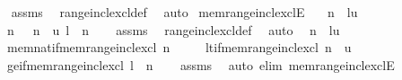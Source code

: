 \begin{isabellebody}
%
\isadelimproof
\ \ %
\endisadelimproof
%
\isatagproof
{}\isamarkupfalse%
\ assms\ \isamarkupfalse%
\ range{\isacharunderscore}{\kern0pt}incl{\isacharunderscore}{\kern0pt}excl{\isacharunderscore}{\kern0pt}def\ \isamarkupfalse%
\ auto%
\endisatagproof
{\isafoldproof}%
%
\isadelimproof
\isanewline
%
\endisadelimproof
\isanewline
{}\isamarkupfalse%
\ mem{\isacharunderscore}{\kern0pt}range{\isacharunderscore}{\kern0pt}incl{\isacharunderscore}{\kern0pt}exclE{\isacharcolon}{\kern0pt}\isanewline
\ \ \ {\isachardoublequoteopen}n\ {\isasymin}\ {\isacharbrackleft}{\kern0pt}l{\isacharcomma}{\kern0pt}{\isasymdots}{\isacharcomma}{\kern0pt}u{\isacharbrackleft}{\kern0pt}{\isachardoublequoteclose}\isanewline
\ \ \ {\isachardoublequoteopen}n\ {\isasymin}\ {\isasymnat}{\isachardoublequoteclose}\ {\isachardoublequoteopen}n\ {\isacharless}{\kern0pt}\ u{\isachardoublequoteclose}\ {\isachardoublequoteopen}l\ {\isasymle}\ n{\isachardoublequoteclose}\isanewline
%
\isadelimproof
\ \ %
\endisadelimproof
%
\isatagproof
{}\isamarkupfalse%
\ assms\ \isamarkupfalse%
\ range{\isacharunderscore}{\kern0pt}incl{\isacharunderscore}{\kern0pt}excl{\isacharunderscore}{\kern0pt}def\ \isamarkupfalse%
\ auto%
\endisatagproof
{\isafoldproof}%
%
\isadelimproof
\isanewline
%
\endisadelimproof
\isanewline
{}\isamarkupfalse%
\ \ {\isachardoublequoteopen}n\ {\isasymin}\ {\isacharbrackleft}{\kern0pt}l{\isacharcomma}{\kern0pt}{\isasymdots}{\isacharcomma}{\kern0pt}u{\isacharbrackleft}{\kern0pt}{\isachardoublequoteclose}\isanewline
\ \ \ mem{\isacharunderscore}{\kern0pt}nat{\isacharunderscore}{\kern0pt}if{\isacharunderscore}{\kern0pt}mem{\isacharunderscore}{\kern0pt}range{\isacharunderscore}{\kern0pt}incl{\isacharunderscore}{\kern0pt}excl{\isacharcolon}{\kern0pt}\ {\isachardoublequoteopen}n\ {\isasymin}\ {\isasymnat}{\isachardoublequoteclose}\isanewline
\ \ \ lt{\isacharunderscore}{\kern0pt}if{\isacharunderscore}{\kern0pt}mem{\isacharunderscore}{\kern0pt}range{\isacharunderscore}{\kern0pt}incl{\isacharunderscore}{\kern0pt}excl{\isacharcolon}{\kern0pt}\ {\isachardoublequoteopen}n\ {\isacharless}{\kern0pt}\ u{\isachardoublequoteclose}\isanewline
\ \ \ ge{\isacharunderscore}{\kern0pt}if{\isacharunderscore}{\kern0pt}mem{\isacharunderscore}{\kern0pt}range{\isacharunderscore}{\kern0pt}incl{\isacharunderscore}{\kern0pt}excl{\isacharcolon}{\kern0pt}\ {\isachardoublequoteopen}l\ {\isasymle}\ n{\isachardoublequoteclose}\isanewline
%
\isadelimproof
\ \ %
\endisadelimproof
%
\isatagproof
{}\isamarkupfalse%
\ assms\ \isamarkupfalse%
\ {\isacharparenleft}{\kern0pt}auto\ elim{\isacharcolon}{\kern0pt}\ mem{\isacharunderscore}{\kern0pt}range{\isacharunderscore}{\kern0pt}incl{\isacharunderscore}{\kern0pt}exclE{\isacharparenright}{\kern0pt}%
\endisatagproof
{\isafoldproof}%
%
\isadelimproof
\isanewline
%
\endisadelimproof
\isanewline
\isanewline
\isanewline
%
\isadelimtheory
\isanewline
%
\endisadelimtheory
%
\isatagtheory
{}\isamarkupfalse%
%
\endisatagtheory
{\isafoldtheory}%
%
\isadelimtheory
%
\endisadelimtheory
%
\end{isabellebody}%
